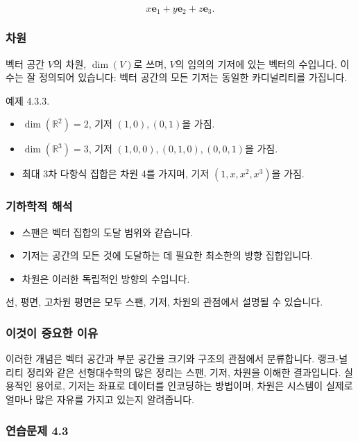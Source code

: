 \documentclass[
  12pt,
  a4paper,
]{article}
\begin{document}
\[x\mathbf{e}_1 + y\mathbf{e}_2 + z\mathbf{e}_3.\]

\subsubsection{차원}\label{dimension}

벡터 공간 \(V\)의 차원, \(\dim(V)\)로 쓰며, \(V\)의 임의의 기저에 있는 벡터의 수입니다. 이 수는 잘 정의되어 있습니다: 벡터 공간의 모든 기저는 동일한 카디널리티를 가집니다.

예제 4.3.3.

\begin{itemize}
\item
  \(\dim(\mathbb{R}^2) = 2\), 기저 \((1,0), (0,1)\)을 가짐.
\item
  \(\dim(\mathbb{R}^3) = 3\), 기저 \((1,0,0), (0,1,0), (0,0,1)\)을 가짐.
\item
  최대 3차 다항식 집합은 차원 4를 가지며, 기저 \((1, x, x^2, x^3)\)을 가짐.
\end{itemize}

\subsubsection{기하학적 해석}\label{geometric-interpretation-6}

\begin{itemize}
\item
  스팬은 벡터 집합의 도달 범위와 같습니다.
\item
  기저는 공간의 모든 것에 도달하는 데 필요한 최소한의 방향 집합입니다.
\item
  차원은 이러한 독립적인 방향의 수입니다.
\end{itemize}

선, 평면, 고차원 평면은 모두 스팬, 기저, 차원의 관점에서 설명될 수 있습니다.

\subsubsection{이것이 중요한 이유}\label{why-this-matters-14}

이러한 개념은 벡터 공간과 부분 공간을 크기와 구조의 관점에서 분류합니다. 랭크-널리티 정리와 같은 선형대수학의 많은 정리는 스팬, 기저, 차원을 이해한 결과입니다. 실용적인 용어로, 기저는 좌표로 데이터를 인코딩하는 방법이며, 차원은 시스템이 실제로 얼마나 많은 자유를 가지고 있는지 알려줍니다.

\subsubsection{연습문제 4.3}\label{exercises-43}
\end{document}

